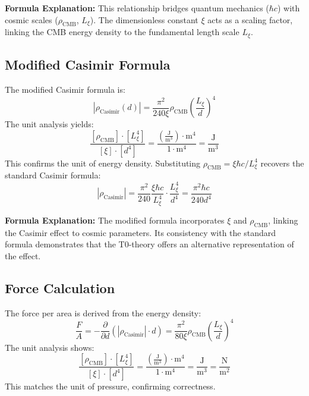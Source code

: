 \documentclass[12pt,a4paper]{report}
\begin{document}
	\textbf{Formula Explanation:} This relationship bridges quantum mechanics ($\hbar c$) with cosmic scales ($\rho_{\text{CMB}}$, $L_\xi$). The dimensionless constant $\xi$ acts as a scaling factor, linking the CMB energy density to the fundamental length scale $L_\xi$.
	
	\subsection{Modified Casimir Formula}
	The modified Casimir formula is:
	\begin{equation}
		|\rho_{\text{Casimir}}(d)| = \frac{\pi^2}{240 \xi} \rho_{\text{CMB}} \left( \frac{L_\xi}{d} \right)^4
	\end{equation}
	The unit analysis yields:
	\begin{equation}
		\frac{[\rho_{\text{CMB}}] \cdot [L_\xi^4]}{[\xi] \cdot [d^4]} = \frac{\left( \frac{\text{J}}{\text{m}^3} \right) \cdot \text{m}^4}{1 \cdot \text{m}^4} = \frac{\text{J}}{\text{m}^3}
	\end{equation}
	This confirms the unit of energy density. Substituting $\rho_{\text{CMB}} = \xi \hbar c / L_\xi^4$ recovers the standard Casimir formula:
	\begin{equation}
		|\rho_{\text{Casimir}}| = \frac{\pi^2}{240} \frac{\xi \hbar c}{L_\xi^4} \cdot \frac{L_\xi^4}{d^4} = \frac{\pi^2 \hbar c}{240 d^4}
	\end{equation}
	
	\textbf{Formula Explanation:} The modified formula incorporates $\xi$ and $\rho_{\text{CMB}}$, linking the Casimir effect to cosmic parameters. Its consistency with the standard formula demonstrates that the T0-theory offers an alternative representation of the effect.
	
	\subsection{Force Calculation}
	The force per area is derived from the energy density:
	\begin{equation}
		\frac{F}{A} = -\frac{\partial}{\partial d} \left( |\rho_{\text{Casimir}}| \cdot d \right) = \frac{\pi^2}{80 \xi} \rho_{\text{CMB}} \left( \frac{L_\xi}{d} \right)^4
	\end{equation}
	The unit analysis shows:
	\begin{equation}
		\frac{[\rho_{\text{CMB}}] \cdot [L_\xi^4]}{[\xi] \cdot [d^4]} = \frac{\left( \frac{\text{J}}{\text{m}^3} \right) \cdot \text{m}^4}{1 \cdot \text{m}^4} = \frac{\text{J}}{\text{m}^3} = \frac{\text{N}}{\text{m}^2}
	\end{equation}
	This matches the unit of pressure, confirming correctness.
	
\end{document}
